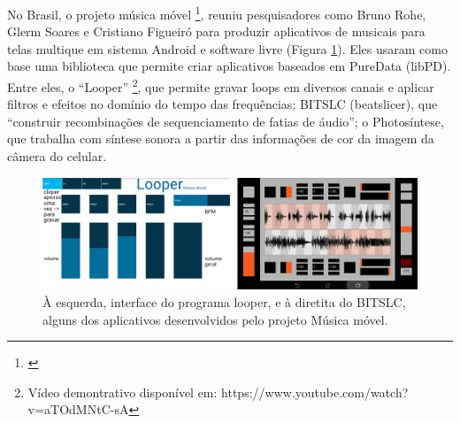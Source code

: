 

No Brasil, o projeto música móvel \footnote{\cite{Rohde2014}}, reuniu pesquisadores como Bruno Rohe, Glerm Soares e Cristiano Figueiró para produzir aplicativos de musicais para telas multique em sistema Android e software livre (Figura \ref{mmovel}). Eles usaram como base uma biblioteca que permite criar aplicativos baseados em PureData (libPD). Entre eles, o ``Looper'' \footnote{Vídeo demontrativo disponível em: https://www.youtube.com/watch?v=aTOdMNtC-sA}, que permite gravar loops em diversos canais e aplicar filtros e efeitos no domínio do tempo das frequências; B\/I\/T\/S\/L\/C (beatslicer), que ``construir
recombinações de sequenciamento de fatias de áudio''; o Photosíntese, que trabalha com síntese sonora a partir das informações de cor da imagem da câmera do celular.

\begin{figure}
    \caption{\label{mmovel}À esquerda, interface do programa looper, e à diretita do B\/I\/T\/S\/L\/C, alguns dos aplicativos desenvolvidos pelo projeto Música móvel.}
    
        \includegraphics[width=1\linewidth]{pictures/cap2/musicamovel}
    
\end{figure}


